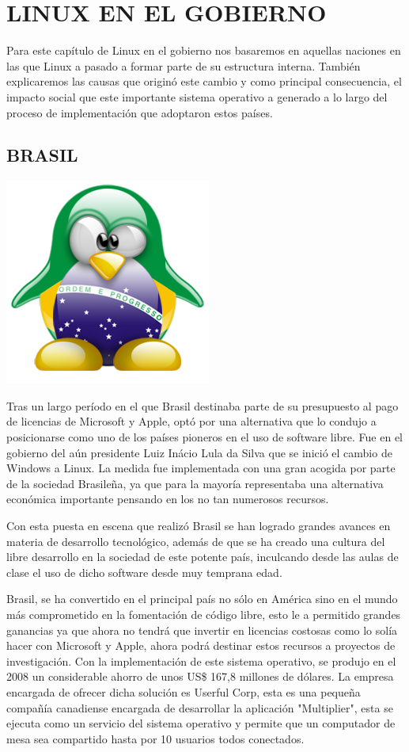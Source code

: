\chapter*{LINUX EN EL GOBIERNO}
Para este capítulo de Linux en el gobierno nos basaremos en aquellas naciones en las que Linux a pasado a formar parte de su estructura interna. También explicaremos las 
causas que originó este cambio y como principal consecuencia, el impacto social que este importante sistema operativo a generado a lo largo del proceso de implementación que 
adoptaron estos países.

\section*{BRASIL}
\includegraphics[scale=0.5]{img/cp03/img0301.png}

Tras un largo período en el que Brasil destinaba parte de su presupuesto al pago de licencias de Microsoft y Apple, optó por una alternativa que lo condujo a posicionarse 
como uno de los países pioneros en el uso de software libre. Fue en el gobierno del aún presidente Luiz Inácio Lula da Silva que se inició el cambio de Windows a Linux. La 
medida fue implementada con una gran acogida por parte de la sociedad Brasileña, ya que para la mayoría representaba una alternativa económica importante pensando en los no 
tan numerosos recursos.

Con esta puesta en escena que realizó Brasil se han logrado grandes avances en materia de desarrollo tecnológico, además de que se ha creado una cultura del libre desarrollo 
en la sociedad de este potente país, inculcando desde las aulas de clase el uso de dicho software desde muy temprana edad.

Brasil, se ha convertido en el principal país no sólo en América sino en el mundo más comprometido en la fomentación de código libre, esto le a permitido grandes ganancias ya 
que ahora no tendrá que invertir en licencias costosas como lo solía hacer con Microsoft y Apple, ahora podrá destinar estos recursos a proyectos de investigación. Con la 
implementación de este sistema operativo, se produjo en el 2008 un considerable ahorro de unos US\$ 167,8 millones de dólares. La empresa encargada de ofrecer dicha solución 
es Userful Corp, esta es una pequeña compañía canadiense encargada de desarrollar la aplicación "Multiplier", esta se ejecuta como un servicio del sistema operativo y permite 
que un computador de mesa sea compartido hasta por 10 usuarios todos conectados.

